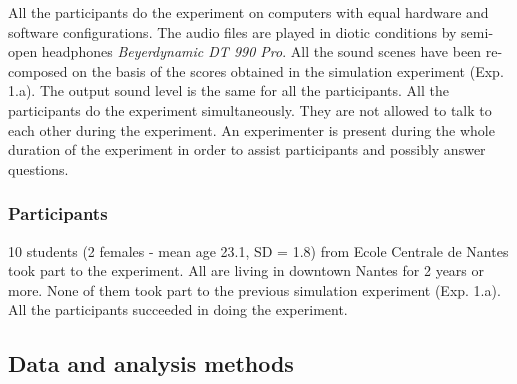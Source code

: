 \documentclass[twoside,twocolumn]{article}
\begin{document}
All the participants do the experiment on computers with equal hardware and software configurations. The audio files are played in diotic conditions by semi-open headphones \emph{Beyerdynamic DT 990 Pro}. All the sound scenes have been re-composed on the basis of the scores obtained in the simulation experiment (Exp. 1.a). The output sound level is the same for all the participants.
All the participants do the experiment simultaneously. They are not allowed to talk to each other during the experiment.
An experimenter is present during the whole duration of the experiment in order to assist participants and possibly answer questions.


\subsubsection*{Participants}

%

10 students (2 females - mean age 23.1, SD = 1.8) from Ecole Centrale de Nantes took part to the experiment. All are living in downtown Nantes for 2 years or more. None of them took part to the previous simulation experiment (Exp. 1.a).
All the participants succeeded in doing the experiment.

\subsection{Data and analysis methods}
\label{sec:xp1_dataAna}
\end{document}
